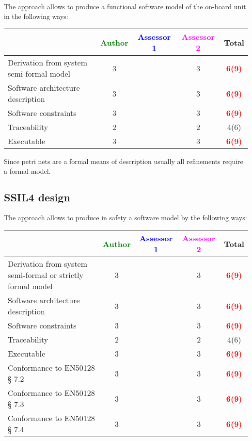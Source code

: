 The approach allows to  produce a functional software model of the on-board unit in the following ways:

\begin{tabular}{|l | c | c | c | c|}
\hline
& \textcolor{green}{Author} & \textcolor{blue}{Assessor 1} & \textcolor{magenta}{Assessor 2} & Total \\
\hline
Derivation from system semi-formal model  & 3     & & 3     & \textcolor{red}{\textbf{6(9)}}   \\
\hline 
Software architecture description  & 3     & & 3     & \textcolor{red}{\textbf{6(9)}}   \\
\hline
Software constraints  & 3     & & 3     & \textcolor{red}{\textbf{6(9)}}   \\
\hline
Traceability  & 2     & & 2     &  4(6) \\
\hline
Executable  & 3     & & 3     & \textcolor{red}{\textbf{6(9)}}   \\
\hline
\end{tabular}

Since petri nets are a formal means of description usually all refinements require a formal model.

\subsection{SSIL4 design}

The approach allows to  produce in safety a software model by the following ways:

\begin{tabular}{|l | c | c | c | c|}
\hline
& \textcolor{green}{Author} & \textcolor{blue}{Assessor 1} & \textcolor{magenta}{Assessor 2} & Total \\
\hline
Derivation from system semi-formal or strictly formal model  & 3     & & 3     & \textcolor{red}{\textbf{6(9)}}   \\
\hline 
Software architecture description  & 3     & & 3     & \textcolor{red}{\textbf{6(9)}}   \\
\hline
Software constraints  & 3     & & 3     & \textcolor{red}{\textbf{6(9)}}   \\
\hline
Traceability  & 2     & & 2     &  4(6) \\
\hline
Executable  & 3     & & 3     & \textcolor{red}{\textbf{6(9)}}   \\
\hline
Conformance to EN50128 § 7.2  & 3     & & 3     & \textcolor{red}{\textbf{6(9)}}   \\
\hline
Conformance to EN50128 § 7.3  & 3     & & 3     & \textcolor{red}{\textbf{6(9)}}   \\
\hline
Conformance to EN50128 § 7.4  & 3     & & 3     & \textcolor{red}{\textbf{6(9)}}   \\
\hline
\end{tabular}

